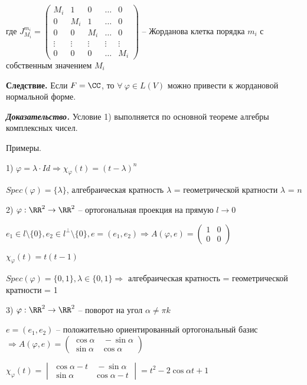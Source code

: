 где $J^{m_i}_{M_i} = \begin{pmatrix} M_i & 1 & 0 & \dots & 0 \\ 0 & M_i & 1 & \dots & 0 \\ 0 & 0 & M_i & \dots & 0
\\ \vdots & \vdots & \vdots & \vdots & \vdots \\ 0 & 0 & 0 & \dots & M_i \end{pmatrix}$ -- Жорданова клетка порядка $m_i$ с собственным значением $M_i$

\bigskip
\textbf{Следствие.} Если $F = \CC$, то $\forall \ \varphi \in L(V)$ можно привести к жордановой нормальной форме.

\bigskip
\textbf{\textit{Доказательство.}} Условие 1) выполняется по основной теореме алгебры комплексных чисел.

\bigskip
Примеры.

1) $\varphi = \lambda \cdot Id \Rightarrow \chi_{\varphi} (t) = (t - \lambda)^n$

$Spec(\varphi) = \{\lambda\}$, алгебраическая кратность $\lambda$ = геометрической кратности $\lambda$ = $n$

2) $\varphi: \RR^2 \rightarrow \RR^2$ -- ортогональная проекция на прямую $l \rightarrow 0$

$e_1 \in l \setminus \{0\}, e_2 \in l^{\bot} \setminus \{0\}, e = (e_1, e_2) \Rightarrow A(\varphi, e) = \begin{pmatrix} 1 & 0 \\ 0 & 0 \end{pmatrix}$

$\chi_{\varphi} (t) = t (t - 1)$

$Spec(\varphi) = \{0, 1\}, \lambda \in \{0, 1\} \Rightarrow$ алгебраическая кратность = геометрической кратности = 1

3) $\varphi: \RR^2 \rightarrow \RR^2$ -- поворот на угол $\alpha \neq \pi k$

$e = (e_1, e_2)$ -- положительно ориентированный ортогональный базис $\Rightarrow A(\varphi, e) = \begin{pmatrix} \cos \alpha & \ - \sin \alpha \\ \sin \alpha & \cos \alpha \end{pmatrix}$

$\chi_{\varphi} (t) = \begin{vmatrix} \cos \alpha - t & \ -\sin \alpha \\ \sin \alpha & \cos \alpha - t \end{vmatrix} = t^2 - 2 \cos \alpha t + 1$

